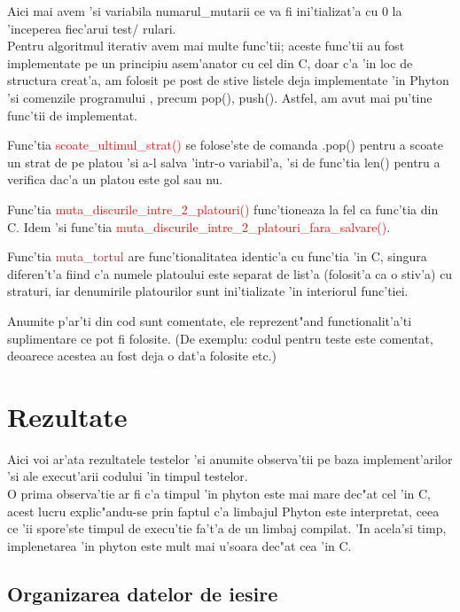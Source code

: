 \documentclass{article}
\begin{document}
Aici mai avem 'si variabila  numarul\_mutarii ce va fi ini'tializat'a cu 0 la 'inceperea fiec'arui test/ rulari.\\

Pentru algoritmul iterativ avem mai multe func'tii; aceste func'tii au fost implementate pe un principiu asem'anator cu cel din C, doar c'a 'in loc de structura creat'a, am folosit pe post de stive listele deja implementate 'in Phyton 'si comenzile programului , precum pop(), push(). Astfel, am avut mai pu'tine func'tii de implementat.

Func'tia \textcolor{red}{scoate\_ultimul\_strat()} se folose'ste de comanda .pop() pentru a scoate un strat de pe platou 'si a-l salva 'intr-o variabil'a, 'si de func'tia len() pentru a verifica dac'a un platou este gol sau nu.

Func'tia \textcolor{red}{muta\_discurile\_intre\_2\_platouri()} func'tioneaza la fel ca func'tia din C. Idem 'si func'tia \textcolor{red}{muta\_discurile\_intre\_2\_platouri\_fara\_salvare()}.

Func'tia \textcolor{brown}{muta\_tortul} are func'tionalitatea identic'a cu func'tia 'in C, singura diferen't'a fiind c'a numele platoului este separat de list'a (folosit'a ca o stiv'a) cu straturi, iar denumirile platourilor sunt ini'tializate 'in interiorul func'tiei.

Anumite p'ar'ti din cod sunt comentate, ele reprezent"and functionalit'a'ti suplimentare ce pot fi folosite. (De exemplu: codul pentru teste este comentat, deoarece acestea au fost deja o dat'a folosite etc.)

\newpage

\section{Rezultate}

Aici voi ar'ata rezultatele testelor 'si anumite observa'tii pe baza implement'arilor 'si ale execut'arii codului 'in timpul testelor.\\

O prima observa'tie ar fi c'a timpul 'in phyton este mai mare dec"at cel 'in C, acest lucru explic"andu-se prin faptul c'a limbajul Phyton este interpretat, ceea ce 'ii spore'ste timpul de execu'tie fa't'a de un limbaj compilat. 'In acela'si timp, implenetarea 'in phyton este mult mai u'soara dec"at cea 'in C.

\subsection{Organizarea datelor de iesire}
\end{document}
